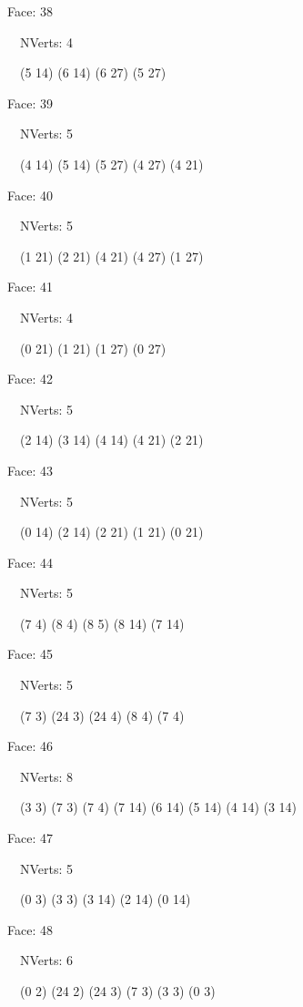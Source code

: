 \documentclass{article}
\begin{document}
{\footnotesize 

Face: 38

\   \    NVerts: 4

 \   \   (5 14) (6 14) (6 27) (5 27)}

{\footnotesize 

Face: 39

\   \    NVerts: 5

 \   \   (4 14) (5 14) (5 27) (4 27) (4 21)}

{\footnotesize 

Face: 40

\   \    NVerts: 5

 \   \   (1 21) (2 21) (4 21) (4 27) (1 27)}

{\footnotesize 

Face: 41

\   \    NVerts: 4

 \   \   (0 21) (1 21) (1 27) (0 27)}

{\footnotesize 

Face: 42

\   \    NVerts: 5

 \   \   (2 14) (3 14) (4 14) (4 21) (2 21)}

{\footnotesize 

Face: 43

\   \    NVerts: 5

 \   \   (0 14) (2 14) (2 21) (1 21) (0 21)}

{\footnotesize 

Face: 44

\   \    NVerts: 5

 \   \   (7 4) (8 4) (8 5) (8 14) (7 14)}

{\footnotesize 

Face: 45

\   \    NVerts: 5

 \   \   (7 3) (24 3) (24 4) (8 4) (7 4)}

{\footnotesize 

Face: 46

\   \    NVerts: 8

 \   \   (3 3) (7 3) (7 4) (7 14) (6 14) (5 14) (4 14) (3 14)}

{\footnotesize 

Face: 47

\   \    NVerts: 5

 \   \   (0 3) (3 3) (3 14) (2 14) (0 14)}

{\footnotesize 

Face: 48

\   \    NVerts: 6

 \   \   (0 2) (24 2) (24 3) (7 3) (3 3) (0 3)}
\end{document}
